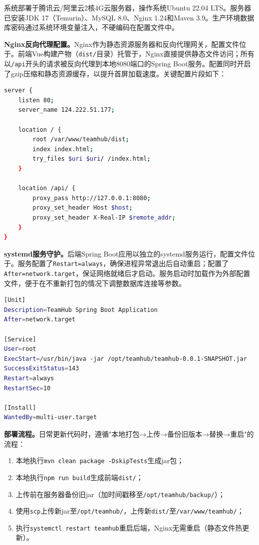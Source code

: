 \documentclass[12pt,a4paper]{ctexart}
\begin{document}
系统部署于腾讯云/阿里云2核4G云服务器，操作系统Ubuntu 22.04 LTS。服务器已安装JDK 17（Temurin）、MySQL 8.0、Nginx 1.24和Maven 3.9。生产环境数据库密码通过系统环境变量注入，不硬编码在配置文件中。

\textbf{Nginx反向代理配置。}Nginx作为静态资源服务器和反向代理网关，配置文件位于。前端Vue构建产物（\texttt{dist/}目录）托管于，Nginx直接提供静态文件访问；所有以\texttt{/api}开头的请求被反向代理到本地8080端口的Spring Boot服务。配置同时开启了gzip压缩和静态资源缓存，以提升首屏加载速度。关键配置片段如下：

\begin{lstlisting}[language=bash, caption=Nginx站点配置片段]
server {
    listen 80;
    server_name 124.222.51.177;

    location / {
        root /var/www/teamhub/dist;
        index index.html;
        try_files $uri $uri/ /index.html;
    }

    location /api/ {
        proxy_pass http://127.0.0.1:8080;
        proxy_set_header Host $host;
        proxy_set_header X-Real-IP $remote_addr;
    }
}
\end{lstlisting}

\textbf{systemd服务守护。}后端Spring Boot应用以独立的systemd服务运行，配置文件位于。服务配置了\texttt{Restart=always}，确保进程异常退出后自动重启；配置了\texttt{After=network.target}，保证网络就绪后才启动。服务启动时加载作为外部配置文件，便于在不重新打包的情况下调整数据库连接等参数。

\begin{lstlisting}[language=bash, caption=teamhub.service配置]
[Unit]
Description=TeamHub Spring Boot Application
After=network.target

[Service]
User=root
ExecStart=/usr/bin/java -jar /opt/teamhub/teamhub-0.0.1-SNAPSHOT.jar
SuccessExitStatus=143
Restart=always
RestartSec=10

[Install]
WantedBy=multi-user.target
\end{lstlisting}

\textbf{部署流程。}日常更新代码时，遵循"本地打包→上传→备份旧版本→替换→重启"的流程：
\begin{enumerate}[label=(\arabic*)]
\item 本地执行\texttt{mvn clean package -DskipTests}生成jar包；
\item 本地执行\texttt{npm run build}生成前端\texttt{dist/}；
\item 上传前在服务器备份旧jar（加时间戳移至\texttt{/opt/teamhub/backup/}）；
\item 使用\texttt{scp}上传新jar至\texttt{/opt/teamhub/}，上传新\texttt{dist/}至\texttt{/var/www/teamhub/}；
\item 执行\texttt{systemctl restart teamhub}重启后端，Nginx无需重启（静态文件热更新）。
\end{enumerate}
\end{document}
